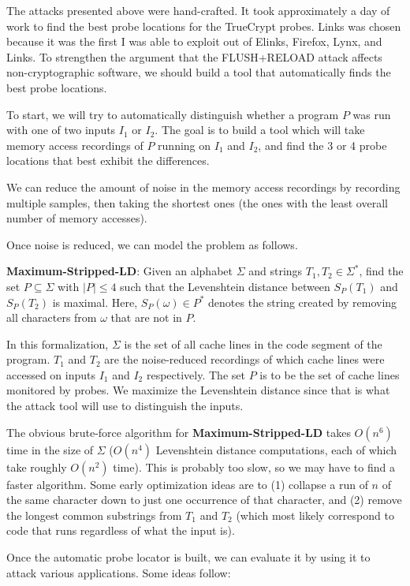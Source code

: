\documentclass{acm_proc_article-sp}
\begin{document}
The attacks presented above were hand-crafted. It took approximately a day of
work to find the best probe locations for the TrueCrypt probes. Links was chosen
because it was the first I was able to exploit out of Elinks, Firefox, Lynx, and
Links. To strengthen the argument that the FLUSH+RELOAD attack affects
non-cryptographic software, we should build a tool that automatically finds the
best probe locations. 

To start, we will try to automatically distinguish whether a program $P$ was run
with one of two inputs $I_1$ or $I_2$. The goal is to build a tool which will
take memory access recordings of $P$ running on $I_1$ and $I_2$, and find the
3 or 4 probe locations that best exhibit the differences.

We can reduce the amount of noise in the memory access recordings by recording
multiple samples, then taking the shortest ones (the ones with the least overall
number of memory accesses).

Once noise is reduced, we can model the problem as follows.

\textbf{Maximum-Stripped-LD}: Given an alphabet $\Sigma$ and strings $T_1, T_2
\in \Sigma^{*}$, find the set $P \subseteq \Sigma$ with $|P| \leq 4$ such that
the Levenshtein distance between $S_P(T_1)$ and $S_P(T_2)$ is maximal. Here,
$S_P(\omega) \in P^{*}$ denotes the string created by removing all characters
from $\omega$ that are not in $P$.

In this formalization, $\Sigma$ is the set of all cache lines in the code
segment of the program. $T_1$ and $T_2$ are the noise-reduced recordings of
which cache lines were accessed on inputs $I_1$ and $I_2$ respectively. The set
$P$ is to be the set of cache lines monitored by probes. We maximize the
Levenshtein distance since that is what the attack tool will use to distinguish
the inputs.

The obvious brute-force algorithm for \textbf{Maximum-Stripped-LD} takes
$O(n^6)$ time in the size of $\Sigma$ ($O(n^4)$ Levenshtein distance
computations, each of which take roughly $O(n^2)$ time). This is probably too
slow, so we may have to find a faster algorithm. Some early optimization ideas
are to (1) collapse a run of $n$ of the same character down to just one
occurrence of that character, and (2) remove the longest common substrings from
$T_1$ and $T_2$ (which most likely correspond to code that runs regardless of
what the input is).

Once the automatic probe locator is built, we can evaluate it by using it to
attack various applications. Some ideas follow:
\end{document}

